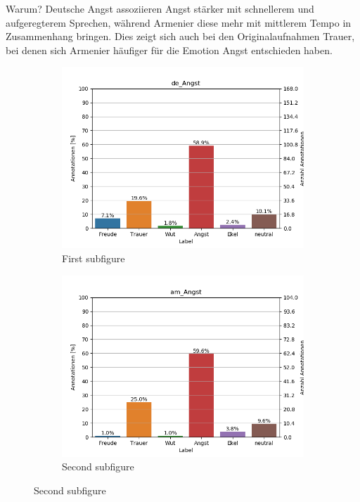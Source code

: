 \documentclass[11pt,a4paper,headsepline,twoside,toc=bibliography]{scrreprt}
\begin{document}
Warum? Deutsche Angst assoziieren Angst stärker mit schnellerem und aufgeregterem Sprechen, während Armenier diese mehr mit mittlerem Tempo in Zusammenhang bringen. Dies zeigt sich auch bei den Originalaufnahmen Trauer, bei denen sich Armenier häufiger für die Emotion Angst entschieden haben.



\begin{figure}[t!] %
	\begin{subfigure}{0.48\textwidth}
		\includegraphics[width=\linewidth]{plots/de_Angst.png}
		\caption{First subfigure} \label{fig:de_A}
	\end{subfigure}\hspace*{\fill}
	\begin{subfigure}{0.48\textwidth}
		\includegraphics[width=\linewidth]{plots/am_Angst.png}
		\caption{Second subfigure} \label{fig:am_A}
	\end{subfigure}
	

\end{figure}
\end{document}
